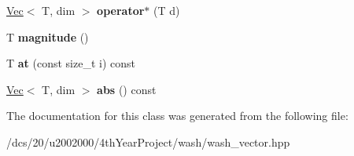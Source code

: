 \begin{DoxyCompactItemize}
\mbox{\hyperlink{classwash_1_1Vec}{Vec}}$<$ T, dim $>$ {\bfseries operator$\ast$} (T d)
\item 
\mbox{\label{classwash_1_1Vec_a41de499daf12160b2cf515ce0c9da70f}} 
T {\bfseries magnitude} ()
\item 
\mbox{\label{classwash_1_1Vec_a1be26013b6d4f898b8504fc258043400}} 
T {\bfseries at} (const size\+\_\+t i) const
\item 
\mbox{\label{classwash_1_1Vec_aae15a1a2cea7e883e53c2e7f6164710a}} 
\mbox{\hyperlink{classwash_1_1Vec}{Vec}}$<$ T, dim $>$ {\bfseries abs} () const
\end{DoxyCompactItemize}


The documentation for this class was generated from the following file\+:\begin{DoxyCompactItemize}
\item 
/dcs/20/u2002000/4th\+Year\+Project/wash/wash\+\_\+vector.\+hpp\end{DoxyCompactItemize}
